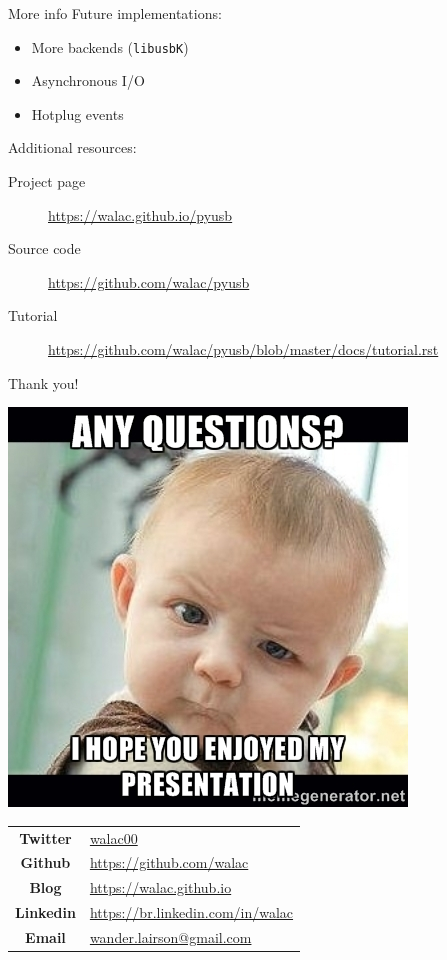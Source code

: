 \documentclass[pdf]{beamer}
\begin{document}
\begin{frame}{More info}
  Future implementations:
  \begin{itemize}
    \item More backends (\texttt{libusbK})
    \item Asynchronous I/O
    \item Hotplug events
  \end{itemize}

  Additional resources:
  \begin{description}
    \item[Project page] \url{https://walac.github.io/pyusb}
    \item[Source code] \url{https://github.com/walac/pyusb}
    \item[Tutorial] \url{https://github.com/walac/pyusb/blob/master/docs/tutorial.rst}
  \end{description}
\end{frame}

\begin{frame}{Thank you!}
  \begin{center}
    \includegraphics[scale=0.2]{img/questions.jpg}
  \end{center}

  \begin{center}
    \begin{tabular}{c l}
      \textbf{Twitter} & \href{https://twitter.com/walac00}{walac00} \\
      \textbf{Github} & \url{https://github.com/walac} \\
      \textbf{Blog} & \url{https://walac.github.io} \\
      \textbf{Linkedin} & \url{https://br.linkedin.com/in/walac} \\
      \textbf{Email} & \href{mailto:wander.lairson@gmail.com}{wander.lairson@gmail.com} \\
    \end{tabular}
  \end{center}

\end{frame}
\end{document}
